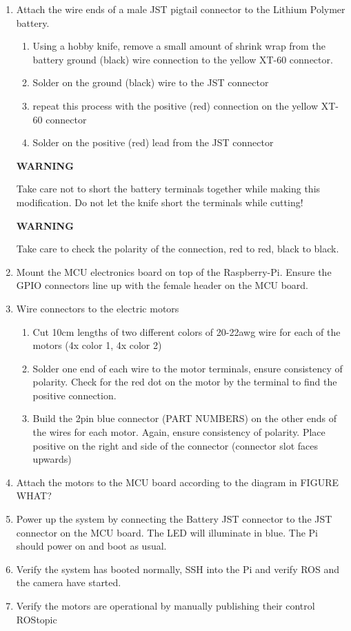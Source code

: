 \documentclass[12pt,titlepage,oneside]{memoir}
\begin{document}
\begin{enumerate}
\item Attach the wire ends of a male JST pigtail connector to the Lithium Polymer battery.\\
	\begin{enumerate}
	\item Using a hobby knife, remove a small amount of shrink wrap from the battery ground (black) wire connection to the yellow XT-60 connector.
	\item Solder on the ground (black) wire to the JST connector
	\item repeat this process with the positive (red) connection on the yellow XT-60 connector
	\item Solder on the positive (red) lead from the JST connector\\
	\end{enumerate}
	\begin{center}\textbf{WARNING}\end{center}
	Take care not to short the battery terminals together while making this modification. Do not let the knife short the terminals while cutting!\\
	\begin{center}\textbf{WARNING}\end{center}
	Take care to check the polarity of the connection, red to red, black to black.
	\item Mount the MCU electronics board on top of the Raspberry-Pi. Ensure the GPIO connectors line up with the female header on the MCU board.
	\item Wire connectors to the electric motors
	\begin{enumerate}
		\item Cut 10cm lengths of two different colors of 20-22awg wire for each of the motors (4x color 1, 4x color 2)
		\item Solder one end of each wire to the motor terminals, ensure consistency of polarity. Check for the red dot on the motor by the terminal to find the positive connection.
		\item Build the 2pin blue connector (PART NUMBERS) on the other ends of the wires for each motor. Again, ensure consistency of polarity. Place positive on the right and side of the connector (connector slot faces upwards)	
	\end{enumerate}
	\item Attach the motors to the MCU board according to the diagram in FIGURE WHAT?
	\item Power up the system by connecting the Battery JST connector to the JST connector on the MCU board. The LED will illuminate in blue. The Pi should power on and boot as usual. 
	\item Verify the system has booted normally, SSH into the Pi and verify ROS and the camera have started.
	\item Verify the motors are operational by manually publishing their control ROStopic
	\begin{enumerate}
	

\end{enumerate}
\end{enumerate}
\end{document}
